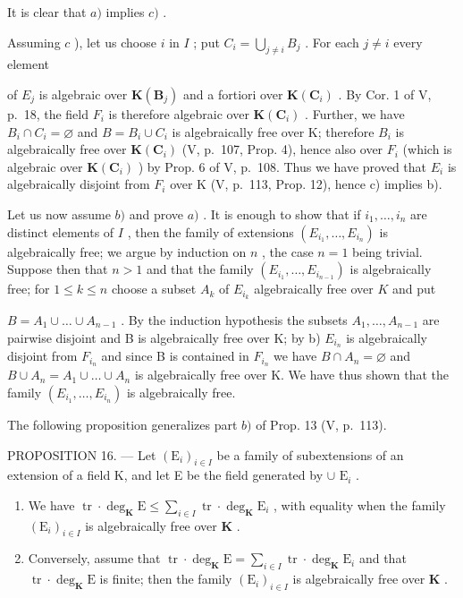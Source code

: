 It is clear that \(a)\) implies \(c)\) .

Assuming \(c\) ), let us choose \(i\) in \(I\) ; put \(C_i = \bigcup_{j \neq i} B_j\) . For each \(j \neq i\) every element

of \(E_{j}\) is algebraic over \(\mathbf{K}(\mathbf{B}_{j})\) and a fortiori over \(\mathbf{K}(\mathbf{C}_{i})\) . By Cor. 1 of V, p.~18, the field \(F_{i}\) is therefore algebraic over \(\mathbf{K}(\mathbf{C}_{i})\) . Further, we have \(B_{i} \cap C_{i} = \varnothing\) and \(B = B_{i} \cup C_{i}\) is algebraically free over K; therefore \(B_{i}\) is algebraically free over \(\mathbf{K}(\mathbf{C}_{i})\) (V, p.~107, Prop. 4), hence also over \(F_{i}\) (which is algebraic over \(\mathbf{K}(\mathbf{C}_{i})\) ) by Prop. 6 of V, p.~108. Thus we have proved that \(E_{i}\) is algebraically disjoint from \(F_{i}\) over K (V, p.~113, Prop. 12), hence c) implies b).

Let us now assume \(b)\) and prove \(a)\) . It is enough to show that if \(i_1, \ldots, i_n\) are distinct elements of \(I\) , then the family of extensions \((E_{i_1}, \ldots, E_{i_n})\) is algebraically free; we argue by induction on \(n\) , the case \(n = 1\) being trivial. Suppose then that \(n > 1\) and that the family \((E_{i_1}, \ldots, E_{i_{n-1}})\) is algebraically free; for \(1 \leqslant k \leqslant n\) choose a subset \(A_k\) of \(E_{i_k}\) algebraically free over \(K\) and put

\(B = A_{1} \cup \ldots \cup A_{n-1}\) . By the induction hypothesis the subsets \(A_{1}, \ldots, A_{n-1}\) are pairwise disjoint and B is algebraically free over K; by b) \(E_{i_{n}}\) is algebraically disjoint from \(F_{i_{n}}\) and since B is contained in \(F_{i_{n}}\) we have \(B \cap A_{n} = \varnothing\) and \(B \cup A_{n} = A_{1} \cup \ldots \cup A_{n}\) is algebraically free over K. We have thus shown that the family \((E_{i_{1}}, \ldots, E_{i_{n}})\) is algebraically free.

The following proposition generalizes part \(b)\) of Prop. 13 (V, p.~113).

PROPOSITION 16. --- Let \((\mathrm{E}_i)_{i\in I}\) be a family of subextensions of an extension of a field K, and let E be the field generated by \(\cup\) \(\mathrm{E}_i\) .

\begin{enumerate}
\def\labelenumi{\alph{enumi})}
\item
  We have \(\operatorname{tr} \cdot \deg_{\mathbf{K}} \mathrm{E} \leqslant \sum_{i \in I} \operatorname{tr} \cdot \deg_{\mathbf{K}} \mathrm{E}_i\) , with equality when the family \((\mathrm{E}_i)_{i \in I}\) is algebraically free over \(\mathbf{K}\) .
\item
  Conversely, assume that \(\operatorname{tr} \cdot \deg_{\mathbf{K}} \mathrm{E} = \sum_{i \in I} \operatorname{tr} \cdot \deg_{\mathbf{K}} \mathrm{E}_i\) and that \(\operatorname{tr} \cdot \deg_{\mathbf{K}} \mathrm{E}\) is finite; then the family \((\mathrm{E}_i)_{i \in I}\) is algebraically free over \(\mathbf{K}\) .
\end{enumerate}

